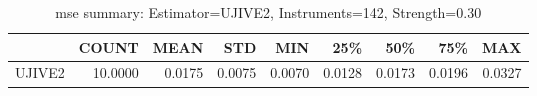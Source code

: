 \begin{table}[ht]
\centering
\caption{mse summary: Estimator=UJIVE2, Instruments=142, Strength=0.30}
\begin{tabular}{lrrrrrrrr}
\toprule
 & COUNT & MEAN & STD & MIN & 25\% & 50\% & 75\% & MAX \\
\midrule
UJIVE2 & 10.0000 & 0.0175 & 0.0075 & 0.0070 & 0.0128 & 0.0173 & 0.0196 & 0.0327 \\
\bottomrule
\end{tabular}
\end{table}
